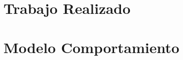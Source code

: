 \documentclass[10pt]{book}
\begin{document}
%    
\chapter{Trabajo Realizado}\label{chp:trabajoRealizado}
\chapter{Modelo Comportamiento}\label{chp:modeloComportamiento}
\end{document}
